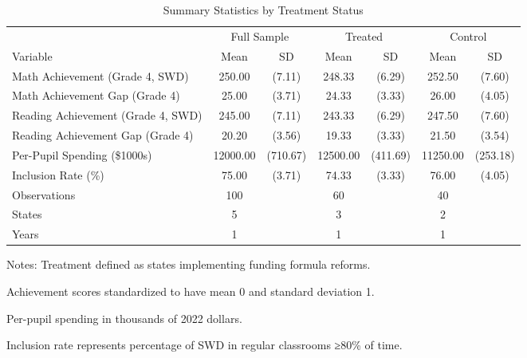\begin{table}[htbp]
\centering
\caption{Summary Statistics by Treatment Status}
\label{tab:summary_statistics}
\begin{tabular}{lcccccc}
\toprule
 & \multicolumn{2}{c}{Full Sample} & \multicolumn{2}{c}{Treated} & \multicolumn{2}{c}{Control} \\
\cmidrule(lr){2-3} \cmidrule(lr){4-5} \cmidrule(lr){6-7}
Variable & Mean & SD & Mean & SD & Mean & SD \\
\midrule
Math Achievement (Grade 4, SWD) & 250.00 & (7.11) & 248.33 & (6.29) & 252.50 & (7.60) \\
Math Achievement Gap (Grade 4) & 25.00 & (3.71) & 24.33 & (3.33) & 26.00 & (4.05) \\
Reading Achievement (Grade 4, SWD) & 245.00 & (7.11) & 243.33 & (6.29) & 247.50 & (7.60) \\
Reading Achievement Gap (Grade 4) & 20.20 & (3.56) & 19.33 & (3.33) & 21.50 & (3.54) \\
Per-Pupil Spending (\$1000s) & 12000.00 & (710.67) & 12500.00 & (411.69) & 11250.00 & (253.18) \\
Inclusion Rate (\%) & 75.00 & (3.71) & 74.33 & (3.33) & 76.00 & (4.05) \\
\midrule
Observations & 100 & & 60 & & 40 & \\
States & 5 & & 3 & & 2 & \\
Years & 1 & & 1 & & 1 & \\
\bottomrule
\end{tabular}
\begin{tablenotes}
\small
\item Notes: Treatment defined as states implementing funding formula reforms.
\item Achievement scores standardized to have mean 0 and standard deviation 1.
\item Per-pupil spending in thousands of 2022 dollars.
\item Inclusion rate represents percentage of SWD in regular classrooms ≥80\% of time.
\end{tablenotes}
\end{table}
\clearpage
